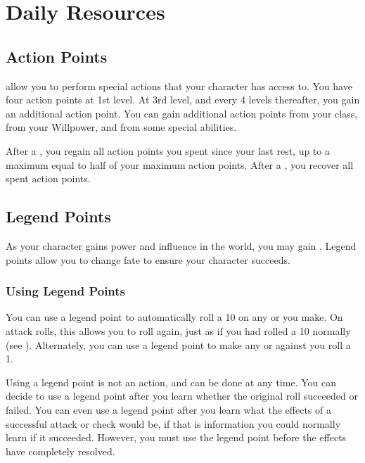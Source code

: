 \section{Daily Resources}

    \subsection{Action Points}\label{Action Points}
         allow you to perform special actions that your character has access to.
        You have four action points at 1st level.
        At 3rd level, and every 4 levels thereafter, you gain an additional action point.
        You can gain additional action points from your class, from your Willpower, and from some special abilities.

        After a , you regain all action points you spent since your last rest, up to a maximum equal to half of your maximum action points.
        After a , you recover all spent action points.

    \subsection{Legend Points}\label{Legend Points}

        As your character gains power and influence in the world, you may gain .
        Legend points allow you to change fate to ensure your character succeeds.

        \subsubsection{Using Legend Points}
            You can use a legend point to automatically roll a 10 on any  or  you make.
            On attack rolls, this allows you to roll again, just as if you had rolled a 10 normally (see ).
            Alternately, you can use a legend point to make any  or  against you roll a 1.

            Using a legend point is not an action, and can be done at any time.
            You can decide to use a legend point after you learn whether the original roll succeeded or failed.
            You can even use a legend point after you learn what the effects of a successful attack or check would be, if that is information you could normally learn if it succeeded.
            However, you must use the legend point before the effects have completely resolved.

